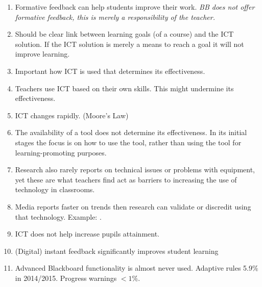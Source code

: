 \begin{enumerate}                                                           
	\item Formative feedback can help students improve their work.\cite{ict_study} \textit{BB does not offer formative feedback, this is merely a responsibility of the teacher.}
	\item Should be clear link between learning goals (of a course) and the ICT solution. If the ICT solution is merely a means to reach a goal it will not improve learning. \cite{ict_study}
	\item Important how ICT is used that determines its effectiveness.\cite{ict_study} 
	\item Teachers use ICT based on their own skills. This might undermine its effectiveness.\cite{ict_study} 
	\item ICT changes rapidly. (Moore's Law)
	\item The availability of a tool does not determine its effectiveness. In its initial stages the focus is on how to use the tool, rather than using the tool for learning-promoting purposes. \cite{ict_study}
	\item Research also rarely reports on technical issues or problems with equipment, yet these are what teachers find act as barriers to increasing the use of technology in classrooms.\cite{ict_study} 
	\item Media reports faster on trends then research can validate or discredit using that technology.\cite{ict_study} Example: . 
	\item ICT does not help increase pupils attainment.\cite{ict_study}
	\item (Digital) instant feedback significantly improves student learning \cite{clicker}
	\item Advanced Blackboard functionality is almost never used. Adaptive rules 5.9$\%$ in 2014/2015. Progress warnings $< 1 \%$. \cite{richard_report}
\end{enumerate}

